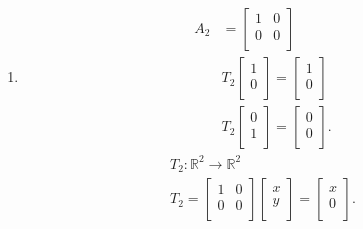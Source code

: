 \documentclass{report}
\begin{document}
{\begin{enumerate}[label=(\roman*)]
		$ T_1$ fixes the x-component and changes the sign of the y-component.\\
		$ T_1$ reflects points in the $ x$-axis.\\
                \item 
			\raggedcolumns
			\begin{multicols}{2}
			\begin{align*}
				A_2 & = \begin{bmatrix}
				1 & 0\\
				0 & 0\\
				\end{bmatrix}\\
				&  T_2 \begin{bmatrix}
				1\\
				0\\
				\end{bmatrix}
				= \begin{bmatrix}
				1\\
				0\\
				\end{bmatrix}
				\\
				& T_2 \begin{bmatrix}
				0\\
				1\\
				\end{bmatrix}
				= \begin{bmatrix}
				0\\
				0\\
				\end{bmatrix}
			.\end{align*}
			\break
			\begin{align*}
				    T_2 : \mathbb{R} ^2 \to \mathbb{R} ^2\\
				    T_2 = \begin{bmatrix}
				    1 & 0\\
				    0 & 0\\
				    \end{bmatrix} \begin{bmatrix}
				    x\\
				    y\\
				    \end{bmatrix}
				    = \begin{bmatrix}
				    x\\
				    0\\
				    \end{bmatrix}
			.\end{align*}
			\end{multicols}
			\begin{tikzpicture}[line cap=round,line join=round,>=Stealth,
                    every node/.style={inner sep=0pt, font=\small}]


\end{tikzpicture}
\end{enumerate}}
\end{document}
